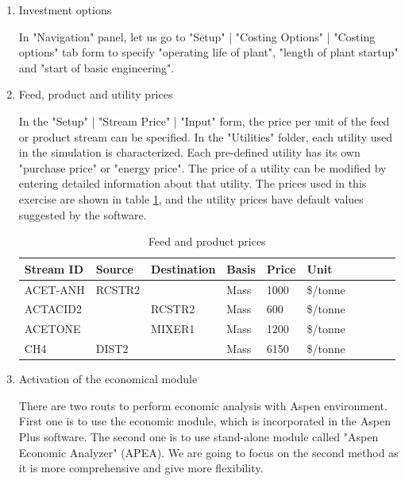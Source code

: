 	\begin{enumerate}[label=\textbf{Step \arabic{enumi}}:,ref=Step \arabic{enumi}]
		
	\item Investment options
	
	In "Navigation" panel, let us go to "Setup" | "Costing Options" | "Costing options" tab form to specify "operating life of plant", "length of plant startup" and "start of basic engineering". %
	

	\item Feed, product and utility prices
	
	In the "Setup" | "Stream Price" | "Input" form, the price per unit of the feed or product stream can be specified. In the "Utilities" folder, each utility used in the simulation is characterized. Each pre-defined utility has its own "purchase price" or "energy price". The price of a utility can be modified by entering detailed information about that utility. The prices used in this exercise are shown in table \ref{tab:Stream_prices}, and the utility prices have default values suggested by the software.
	
	\begin{table}[!ht]
		\centering
		\begin{tabular}{|l|l|l|l|l|l|l|l|l|l|}
			\hline
			Stream ID & Source & Destination & Basis & Price & Unit \\ \hline
			ACET-ANH & RCSTR2 & ~ & Mass & 1000 & \$/tonne  \\ \hline
			ACTACID2 & ~ & RCSTR2 & Mass & 600 & \$/tonne   \\ \hline
			ACETONE & ~ & MIXER1 & Mass & 1200 & \$/tonne  \\ \hline
			CH4 & DIST2 & ~ & Mass & 6150 & \$/tonne   \\ \hline
		\end{tabular}
	\caption{Feed and product prices}
	\label{tab:Stream_prices}
	\end{table}
	
	\item Activation of the economical module
	
	There are two routs to perform economic analysis with Aspen environment. First one is to use the economic module, which is incorporated in the Aspen Plus software. The second one is to use stand-alone module called "Aspen Economic Analyzer" (APEA). We are going to focus on the second method as it is more comprehensive and give more flexibility. 
	

\end{enumerate}

